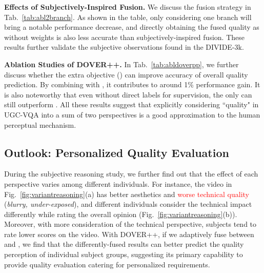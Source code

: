\documentclass[10pt,twocolumn,letterpaper]{article}
\renewcommand{\paragraph}[1]{\noindent \textbf{#1}}
\newcommand{\rblue}[1]{{\textcolor{mblue}{#1}}}
\newcommand{\red}[1]{\textcolor{red}{#1}}
\begin{document}
\paragraph{Effects of Subjectively-Inspired Fusion.} We discuss the fusion strategy in Tab.~\ref{tab:abl2branch}. As shown in the table, only considering one branch will bring a notable performance decrease, and directly obtaining the fused quality as  without weights is also less accurate than subjectively-inspired fusion. These results further validate the subjective observations found in the DIVIDE-3k.

\paragraph{Ablation Studies of DOVER++.} In Tab.~\ref{tab:abldoverpp}, we further discuss whether the extra objective () can improve accuracy of overall quality prediction. By combining  with , it contributes to around 1\% performance gain. It is also noteworthy that even without direct  labels for supervision, the  only can still outperform . All these results suggest that explicitly considering ``quality" in UGC-VQA into a sum of two perspectives is a good approximation to the human perceptual mechanism.

\subsection{Outlook: Personalized Quality Evaluation}
\label{sec:personalized}

 During the subjective reasoning study, we further find out that the effect of each perspective varies among different individuals. For instance, the video in Fig.~\ref{fig:variantreasoning}{(a)} has {\rblue{better aesthetics}} and \red{worse technical quality} (\textit{blurry, under-exposed}), and different individuals consider the technical impact differently while rating the overall opinion (Fig.~\ref{fig:variantreasoning}{(b)}).
 Moreover, with more consideration of the technical perspective, subjects tend to rate lower scores on the video. With DOVER++, if we adaptively fuse between  and , we find that the differently-fused results can better predict the quality perception of individual subject groups, suggesting its primary capability to provide quality evaluation catering for personalized requirements.
\end{document}
